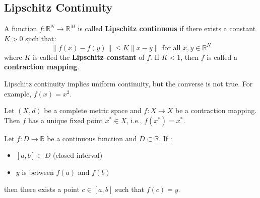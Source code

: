 \subsection{Lipschitz Continuity}
\begin{definition}
    A function $f: \mathbb{R}^N \to \mathbb{R}^M$ is called \textbf{Lipschitz continuous} if there exists a constant $K > 0$ such that:
    $$\|f(x) - f(y)\| \leq K \|x - y\| \text{ for all } x,y \in \mathbb{R}^N$$
    where $K$ is called the \textbf{Lipschitz constant} of $f$. If $K < 1$, then $f$ is called a \textbf{contraction mapping}.
\end{definition}
\begin{remark}
    Lipschitz continuity implies uniform continuity, but the converse is not true. For example, $f(x) = x^2 $.
\end{remark}

\begin{theorem}
    Let $(X, d)$ be a complete metric space and $f: X \to X$ be a contraction mapping. Then $f$ has a unique fixed point $x^* \in X$, i.e., $f(x^*) = x^*$.
\end{theorem}


\begin{theorem}
    Let $f: D \to \mathbb{R}$ be a continuous function and $D \subset \mathbb{R}$. If :
    \begin{itemize}
        \item $[a,b] \subset D$ (closed interval)
        \item $y$ is between $f(a)$ and $f(b)$
    \end{itemize}
    then there exists a point $c \in [a,b]$ such that $f(c) = y$.
\end{theorem}
%








